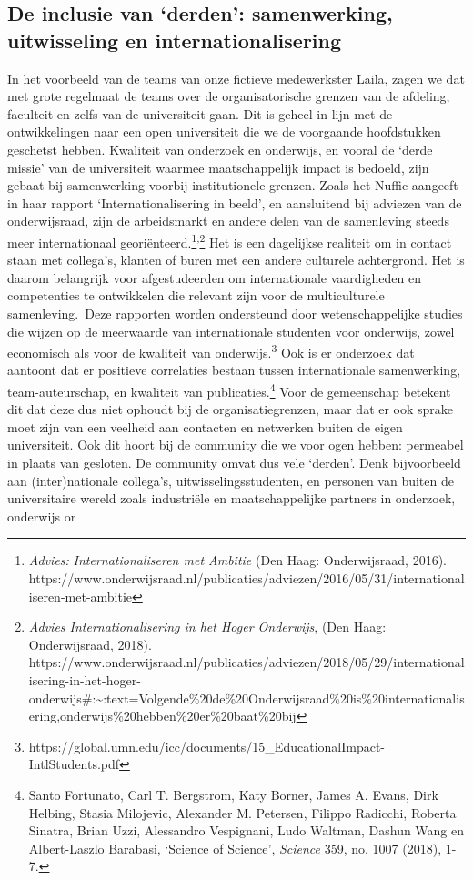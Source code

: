 \documentclass[smallauthor, chapterhaspagenum, nochapterinheader, pagenuminheader,  bigchapnum,medium2, tocpages,  garamond, titleinheader]{jote-book}
\begin{document}
	\subsection{De inclusie van ‘derden': samenwerking, uitwisseling en internationalisering}



	In het voorbeeld van de teams van onze fictieve medewerkster Laila, zagen we dat met grote regelmaat de teams over de organisatorische grenzen van de afdeling, faculteit en zelfs van de universiteit gaan. Dit is geheel in lijn met de ontwikkelingen naar een open universiteit die we de voorgaande hoofdstukken geschetst hebben. Kwaliteit van onderzoek en onderwijs, en vooral de ‘derde missie' van de universiteit waarmee maatschappelijk impact is bedoeld, zijn gebaat bij samenwerking voorbij institutionele grenzen. Zoals het Nuffic aangeeft in haar rapport ‘Internationalisering in beeld', en aansluitend bij adviezen van de onderwijsraad, zijn de arbeidsmarkt en andere delen van de samenleving steeds meer internationaal georiënteerd.\footnote{\emph{ }\emph{Advies:}\emph{ }\emph{Internationaliseren met Ambitie}\emph{ }(Den Haag: Onderwijsraad, 2016). https://www.onderwijsraad.nl/publicaties/adviezen/2016/05/31/internationaliseren-met-ambitie}\textsuperscript{,}\footnote{\emph{ }\emph{Advies Internationalisering in het Hoger Onderwijs}, (Den Haag: Onderwijsraad, 2018). https://www.onderwijsraad.nl/publicaties/adviezen/2018/05/29/internationalisering-in-het-hoger-onderwijs\#:\textasciitilde{}:text=Volgende\%20de\%20Onderwijsraad\%20is\%20internationalisering,onderwijs\%20hebben\%20er\%20baat\%20bij} Het is een dagelijkse realiteit om in contact staan met collega's, klanten of buren met een andere culturele achtergrond. Het is daarom belangrijk voor afgestudeerden om internationale vaardigheden en competenties te ontwikkelen die relevant zijn voor de multiculturele samenleving. Deze rapporten worden ondersteund door wetenschappelijke studies die wijzen op de meerwaarde van internationale studenten voor onderwijs, zowel economisch als voor de kwaliteit van onderwijs.\footnote{https://global.umn.edu/icc/documents/15\_EducationalImpact-IntlStudents.pdf} Ook is er onderzoek dat aantoont dat er positieve correlaties bestaan tussen internationale samenwerking, team-auteurschap, en kwaliteit van publicaties.\footnote{Santo Fortunato, Carl T. Bergstrom, Katy Borner, James A. Evans, Dirk Helbing, Stasia Milojevic, Alexander M. Petersen, Filippo Radicchi, Roberta Sinatra, Brian Uzzi, Alessandro Vespignani, Ludo Waltman, Dashun Wang en Albert-Laszlo Barabasi, ‘Science of Science', \emph{Science}\emph{ }359, no. 1007 (2018), 1-7. } Voor de gemeenschap betekent dit dat deze dus niet ophoudt bij de organisatiegrenzen, maar dat er ook sprake moet zijn van een veelheid aan contacten en netwerken buiten de eigen universiteit. Ook dit hoort bij de community die we voor ogen hebben: permeabel in plaats van gesloten. De community omvat dus vele ‘derden'. Denk bijvoorbeeld aan (inter)nationale collega's, uitwisselingsstudenten, en personen van buiten de universitaire wereld zoals industriële en maatschappelijke partners in onderzoek, onderwijs or 
\end{document}
